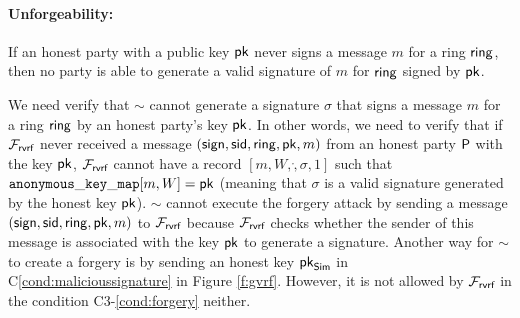 \paragraph{Unforgeability:}  If an honest party with a public key $ \mathsf{pk} $ never signs a message $ m $ for a ring $ \mathsf{ring} $, then no party is able to generate a valid signature of $ m $ for $ \mathsf{ring} $ signed by $ \mathsf{pk} $. 

We need verify that $ \sim $ cannot generate a signature $ \sigma $ that signs a message $ m $ for a ring $ \mathsf{ring} $ by an honest party's key $ \mathsf{pk} $. In other words, we need to verify that if $ \mathcal{F}_{\textsf{rvrf}} $ never received a message $ (\mathsf{sign}, \textsf{sid},\mathsf{ring},\mathsf{pk},m) $ from an honest party $ \mathsf{P} $ with the key $ \mathsf{pk} $, $ \mathcal{F}_{\textsf{rvrf}} $ cannot have a record $ [m, W, \ring, \sigma, 1] $ such that $ \mathtt{anonymous\_key\_map}[m,W]  = \mathsf{pk}$ (meaning that $ \sigma $ is a valid signature generated by the honest key $ \mathsf{pk} $). 
$ \sim $ cannot execute the forgery attack by sending a message $ (\mathsf{sign}, \textsf{sid},\mathsf{ring},\mathsf{pk},m) $ to $ \mathcal{F}_{\textsf{rvrf}} $ because $ \mathcal{F}_{\textsf{rvrf}} $ checks whether the sender of this message is associated with the key $ \mathsf{pk} $ to generate a signature. Another way for $ \sim $ to create a forgery is by sending an honest key $ \mathsf{pk}_{\mathsf{Sim}} $  in C\ref{cond:malicioussignature} in Figure \ref{f:gvrf}. However, it is not allowed by $ \mathcal{F}_{\textsf{rvrf}} $ in the condition C3-\ref{cond:forgery} neither.


%

